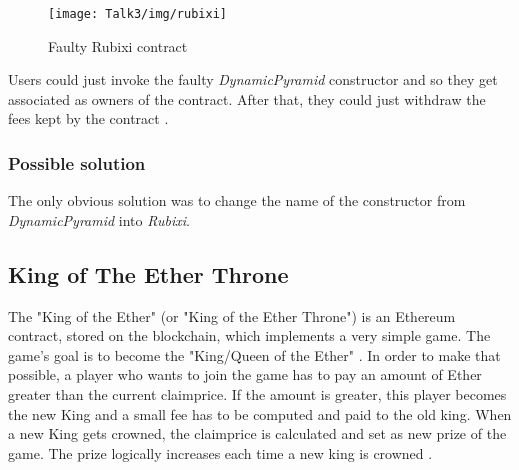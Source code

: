 \begin{figure}[H]
\begin{center}
\texttt{[image: Talk3/img/rubixi]}
\end{center}
\caption{Faulty Rubixi contract}
\label{label}
\end{figure}

Users could just invoke the faulty \textit{DynamicPyramid} constructor and so they get associated as owners of the contract. After that, they could just withdraw the fees kept by the contract \cite{rubixi1}. 

\subsubsection{Possible solution}
The only obvious solution was to change the name of the constructor from \textit{DynamicPyramid} into \textit{Rubixi}.


\subsection{King of The Ether Throne}
The "King of the Ether" (or "King of the Ether Throne") is an Ethereum contract, stored on the blockchain, which implements a very simple game. The game's goal is to become the "King/Queen of the Ether" \cite{kingoftheether}. In order to make that possible, a player who wants to join the game has to pay an amount of Ether greater than the current claimprice. If the amount is greater, this player becomes the new King and a small fee has to be computed and paid to the old king. 
When a new King gets crowned, the claimprice is calculated and set as new prize of the game. The prize logically increases each time a new king is crowned \cite{paper2}. \\


